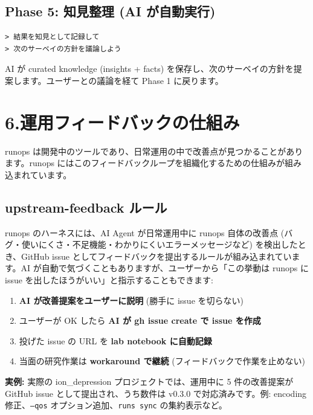 \documentclass[a4paper,11pt]{article}
\newenvironment{infobox}{%
  \medskip\noindent
  \fboxrule=0.5pt\fboxsep=8pt
  \fcolorbox{infoframe}{infobg}\bgroup\minipage{\dimexpr\linewidth-2\fboxsep-2\fboxrule}
}{%
  \endminipage\egroup\medskip
}
\begin{document}
\subsection*{\color{accent} Phase 5: 知見整理 (AI が自動実行)}

\begin{lstlisting}[language={},commentstyle={}]
> 結果を知見として記録して
> 次のサーベイの方針を議論しよう
\end{lstlisting}

AI が curated knowledge (insights + facts) を保存し、次のサーベイの方針を提案します。ユーザーとの議論を経て Phase 1 に戻ります。

\section*{\color{darkblue} 6.\quad 運用フィードバックの仕組み}

runops は開発中のツールであり、日常運用の中で改善点が見つかることがあります。runops にはこのフィードバックループを組織化するための仕組みが組み込まれています。

\subsection*{\color{accent} upstream-feedback ルール}

runops のハーネスには、AI Agent が日常運用中に runops 自体の改善点 (バグ・使いにくさ・不足機能・わかりにくいエラーメッセージなど) を検出したとき、GitHub issue としてフィードバックを提出するルールが組み込まれています。AI が自動で気づくこともありますが、ユーザーから「この挙動は runops に issue を出したほうがいい」と指示することもできます:

\begin{enumerate}[nosep]
  \item \textbf{AI が改善提案をユーザーに説明} (勝手に issue を切らない)
  \item ユーザーが OK したら \textbf{AI が gh issue create で issue を作成}
  \item 投げた issue の URL を \textbf{lab notebook に自動記録}
  \item 当面の研究作業は \textbf{workaround で継続} (フィードバックで作業を止めない)
\end{enumerate}

\begin{infobox}
\textbf{実例:} 実際の ion\_depression プロジェクトでは、運用中に 5 件の改善提案が GitHub issue として提出され、うち数件は v0.3.0 で対応済みです。例: encoding 修正、\texttt{--qos} オプション追加、\texttt{runs sync} の集約表示など。
\end{infobox}
\end{document}
